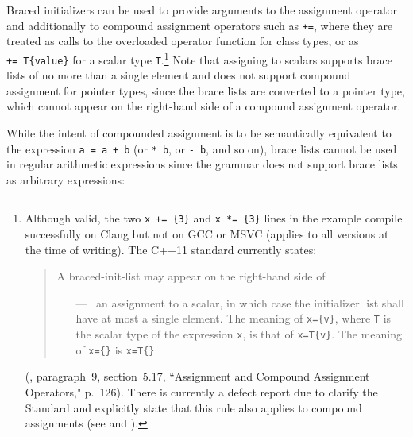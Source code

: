 Braced initializers can be used to provide arguments to the assignment
operator and additionally to compound assignment operators such as
\lstinline!+=!, where they are treated as calls to the overloaded operator
function for class types, or as \lstinline!+=!~\lstinline!T{value}! for a
scalar type \lstinline!T!.{\cprotect\footnote{Although valid, the two
  \lstinline!x!~\lstinline!+=!~\lstinline!{3}! and
  \lstinline!x!~\lstinline!*=!~\lstinline!{3}! lines in the example compile
  successfully on Clang but not on GCC or MSVC (applies to all versions
  at the time of writing). The C++11 standard currently states: 
  \begin{quote}
  A braced-init-list may appear on the right-hand side of
  \begin{itemize}
  \item[---~]{an assignment to a scalar, in which case the initializer list
  shall have at most a single element. The meaning of
  \lstinline!x={v}!, where \lstinline!T! is the scalar
  type of the expression \lstinline!x!, is that of
  \lstinline!x=T{v}!. The meaning of
  \lstinline!x={}! is
  \lstinline!x=T{}!}
  \end{itemize}
  \end{quote} 
  (\cite{cpp11}, paragraph~9, section~5.17, ``Assignment and Compound Assignment Operators," p.~126). There is currently a defect
  report due to clarify the Standard and explicitly state that this rule
  also applies to compound assignments (see \cite{miller12} and
  \cite{miller21}).}} Note
that assigning to scalars supports brace lists of no more than a single
element and does not support compound assignment for pointer types,
since the brace lists are converted to a pointer type, which cannot
appear on the right-hand side of a compound assignment operator.

While the intent of compounded assignment is to be semantically
equivalent to the expression
\lstinline!a!~\lstinline!=!~\lstinline!a!~\lstinline!+!~\lstinline!b! (or
\lstinline!*!~\lstinline!b!, or \lstinline!-!~\lstinline!b!, and so on), brace lists
cannot be used in regular arithmetic expressions since the grammar does
not support brace lists as arbitrary expressions:

